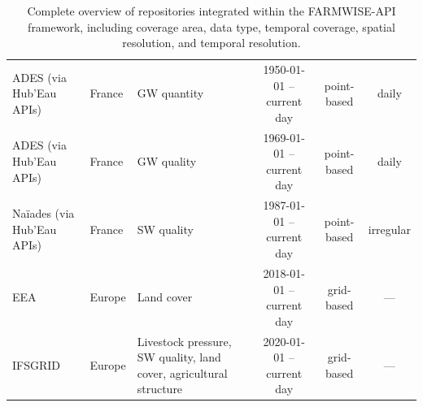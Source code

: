 \documentclass[preprint,12pt,authoryear]{elsarticle}
\begin{document}
\begin{table}
\begin{tabularx}{\textwidth}{@{} >{\raggedright\arraybackslash}X l >{\raggedright\arraybackslash}X c c c @{}}
        ADES (via Hub'Eau APIs) & France & GW quantity & 1950-01-01 – current day & point-based & daily \\
        ADES (via Hub'Eau APIs) & France & GW quality & 1969-01-01 – current day & point-based & daily \\
        Naïades (via Hub'Eau APIs) & France & SW quality & 1987-01-01 – current day & point-based & irregular \\
        EEA & Europe & Land cover & 2018-01-01 – current day & grid-based & — \\
        IFSGRID & Europe & Livestock pressure, SW quality, land cover, agricultural structure & 2020-01-01 – current day & grid-based & — \\ \bottomrule
    \end{tabularx}
    \caption{Complete overview of repositories integrated within the FARMWISE-API framework, including coverage area, data type, temporal coverage, spatial resolution, and temporal resolution.}
    \label{tab:repo_appendix_complete}
\end{table}

 






\end{document}

